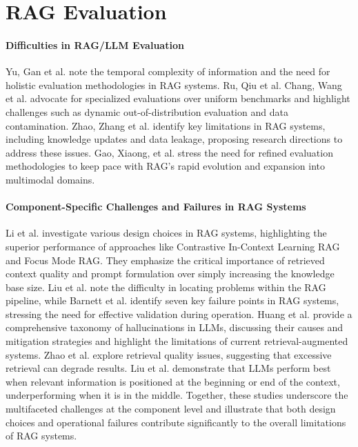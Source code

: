 \section{RAG Evaluation}

\paragraph{Difficulties in RAG/LLM Evaluation}
Yu, Gan et al.\cite{Yu.2024} note the temporal complexity of information and the need for holistic evaluation methodologies in RAG systems. Ru, Qiu et al. Chang, Wang et al.\cite{Chang.06.07.2023} advocate for specialized evaluations over uniform benchmarks and highlight challenges such as dynamic out-of-distribution evaluation and data contamination. Zhao, Zhang et al.\cite{Zhao.29.02.2024} identify key limitations in RAG systems, including knowledge updates and data leakage, proposing research directions to address these issues. Gao, Xiaong, et al.\cite{Gao.18.12.2023} stress the need for refined evaluation methodologies to keep pace with RAG's rapid evolution and expansion into multimodal domains. 

\paragraph{Component-Specific Challenges and Failures in RAG Systems}
Li et al.\cite{Li.13.01.2025} investigate various design choices in RAG systems, highlighting the superior performance of approaches like Contrastive In-Context Learning RAG and Focus Mode RAG. They emphasize the critical importance of retrieved context quality and prompt formulation over simply increasing the knowledge base size. Liu et al.\cite{JintaoLiu.2024} note the difficulty in locating problems within the RAG pipeline, while Barnett et al.\cite{Barnett.2024} identify seven key failure points in RAG systems, stressing the need for effective validation during operation. Huang et al.\cite{Huang_2023} provide a comprehensive taxonomy of hallucinations in LLMs, discussing their causes and mitigation strategies and highlight the limitations of current retrieval-augmented systems. Zhao et al.\cite{Zhao.29.02.2024} explore retrieval quality issues, suggesting that excessive retrieval can degrade results. Liu et al.\cite{Liu.06.07.2023} demonstrate that LLMs perform best when relevant information is positioned at the beginning or end of the context, underperforming when it is in the middle. Together, these studies underscore the multifaceted challenges at the component level and illustrate that both design choices and operational failures contribute significantly to the overall limitations of RAG systems.


